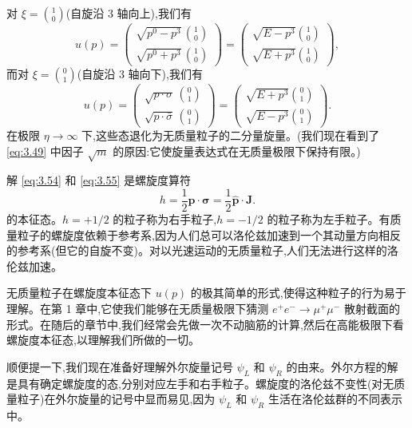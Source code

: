 对 $\xi = \binom{1}{0}$(自旋沿 3 轴向上),我们有
\begin{equation}
  u(p) = \begin{pmatrix}
    \sqrt{p^0-p^3}\,\binom{1}{0}\\
    \sqrt{p^0+p^3}\,\binom{1}{0}
  \end{pmatrix}
  = \begin{pmatrix}
    \sqrt{E-p^3}\binom{1}{0}\\
    \sqrt{E+p^3}\binom{1}{0}
  \end{pmatrix},
  \label{eq:3.54}
\end{equation}
而对 $\xi = \binom{0}{1}$(自旋沿 3 轴向下),我们有
\begin{equation}
  u(p) = \begin{pmatrix}
    \sqrt{p\cdot\sigma}\,\binom{0}{1}\\
    \sqrt{p\cdot\bar{\sigma}}\,\binom{0}{1}
  \end{pmatrix}
  = \begin{pmatrix}
    \sqrt{E+p^3}\binom{0}{1}\\
    \sqrt{E-p^3}\binom{0}{1}
  \end{pmatrix}.
  \label{eq:3.55}
\end{equation}
在极限 $\eta\to\infty$ 下,这些态退化为无质量粒子的二分量旋量。(我们现在看到了 \eqref{eq:3.49} 中因子 $\sqrt{m}$ 的原因:它使旋量表达式在无质量极限下保持有限。)

解 \eqref{eq:3.54} 和 \eqref{eq:3.55} 是螺旋度算符
\begin{equation}
  h = \frac{1}{2}\hat{\mathbf{p}}\cdot\bm{\sigma}
  = \frac{1}{2}\hat{\mathbf{p}}\cdot\mathbf{J}.
  \label{eq:3.56}
\end{equation}
的本征态。$h = +1/2$ 的粒子称为右手粒子,$h = -1/2$ 的粒子称为左手粒子。有质量粒子的螺旋度依赖于参考系,因为人们总可以洛伦兹加速到一个其动量方向相反的参考系(但它的自旋不变)。对以光速运动的无质量粒子,人们无法进行这样的洛伦兹加速。

无质量粒子在螺旋度本征态下 $u(p)$ 的极其简单的形式,使得这种粒子的行为易于理解。在第 1 章中,它使我们能够在无质量极限下猜测 $e^{+}e^{-}\to\mu^{+}\mu^{-}$ 散射截面的形式。在随后的章节中,我们经常会先做一次不动脑筋的计算,然后在高能极限下看螺旋度本征态,以理解我们所做的一切。

顺便提一下,我们现在准备好理解外尔旋量记号 $\psi_L$ 和 $\psi_R$ 的由来。外尔方程的解是具有确定螺旋度的态,分别对应左手和右手粒子。螺旋度的洛伦兹不变性(对无质量粒子)在外尔旋量的记号中显而易见,因为 $\psi_L$ 和 $\psi_R$ 生活在洛伦兹群的不同表示中。

